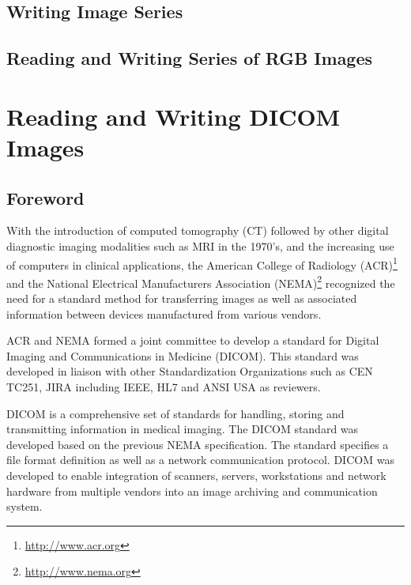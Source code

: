\subsection{Writing Image Series}
\label{sec:WritingImageSeries}


\subsection{Reading and Writing Series of RGB Images}
\label{sec:ReadingWritingRGBImageSeries}



\section{Reading and Writing DICOM Images}
\label{sec:ReadingDicomImageSeries2}


\subsection{Foreword}
With the introduction of computed tomography (CT) followed by other digital
diagnostic imaging modalities such as MRI in the 1970's, and the increasing use
of computers in clinical applications, the American College of Radiology
(ACR)\footnote{\url{http://www.acr.org}} and the National Electrical
Manufacturers Association (NEMA)\footnote{\url{http://www.nema.org}} recognized
the need for a standard method for transferring images as well as associated
information between devices manufactured from various vendors.

ACR and NEMA formed a joint committee to develop a standard for Digital Imaging
and Communications in Medicine (DICOM).  This standard was developed in liaison
with other Standardization Organizations such as CEN TC251, JIRA including
IEEE, HL7 and ANSI USA as reviewers.

DICOM is a comprehensive set of standards for handling, storing and
transmitting information in medical imaging. The DICOM standard was developed
based on the previous NEMA specification.  The standard specifies a file format
definition as well as a network communication protocol. DICOM was developed to
enable integration of scanners, servers, workstations and network hardware from
multiple vendors into an image archiving and communication system.

